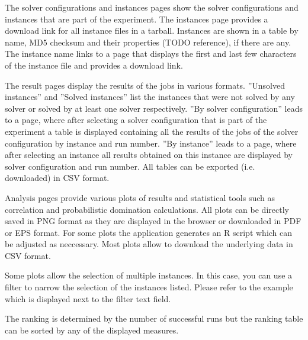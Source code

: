 The solver configurations and instances pages show the solver configurations and instances that are part of the experiment. The instances page provides a download link
for all instance files in a tarball.
Instances are shown in a table by name, MD5 checksum and their properties (TODO reference), if there are any. The instance name links to a page that displays the 
first and last few characters of the instance file and provides a download link.

The result pages display the results of the jobs in various formats. ''Unsolved instances'' and ''Solved instances'' list the instances that
were not solved by any solver or solved by at least one solver respectively. ''By solver configuration'' leads to a page, where after selecting a solver configuration
that is part of the experiment a table is displayed containing all the results of the jobs of the solver configuration by instance and run number.
''By instance'' leads to a page, where after selecting an instance all results obtained on this instance are displayed by solver configuration and run number.
All tables can be exported (i.e. downloaded) in CSV format.

Analysis pages provide various plots of results and statistical tools such as correlation and probabilistic domination calculations. All plots can be directly saved
in PNG format as they are displayed in the browser or downloaded in PDF or EPS format. For some plots the application generates an R script which can be adjusted as
neccessary.
Most plots allow to download the underlying data in CSV format.

Some plots allow the selection of multiple instances. In this case, you can use a filter to narrow the selection of the instances listed. Please refer to the example
which is displayed next to the filter text field.

The ranking is determined by the number of successful runs but the ranking table can be sorted by any of the displayed measures.